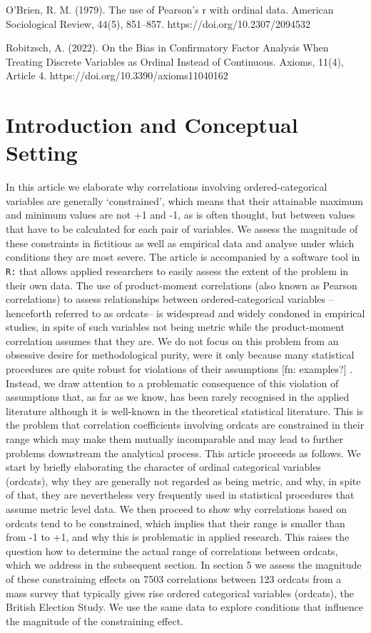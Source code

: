 \documentclass[
  12pt,
]{article}
\theoremstyle{plain}
\theoremstyle{definition}
\theoremstyle{remark}
\begin{document}
O'Brien, R. M. (1979). The use of Pearson's r with ordinal data.
American Sociological Review, 44(5), 851--857.
https://doi.org/10.2307/2094532

Robitzsch, A. (2022). On the Bias in Confirmatory Factor Analysis When
Treating Discrete Variables as Ordinal Instead of Continuous. Axioms,
11(4), Article 4. https://doi.org/10.3390/axioms11040162

\section{Introduction and Conceptual
Setting}\label{introduction-and-conceptual-setting}

In this article we elaborate why correlations involving
ordered-categorical variables are generally `constrained', which means
that their attainable maximum and minimum values are not +1 and -1, as
is often thought, but between values that have to be calculated for each
pair of variables. We assess the magnitude of these constraints in
fictitious as well as empirical data and analyse under which conditions
they are most severe. The article is accompanied by a software tool in
\texttt{R:} that allows applied researchers to easily assess the extent
of the problem in their own data. The use of product-moment correlations
(also known as Pearson correlations) to assess relationships between
ordered-categorical variables --henceforth referred to as ordcats-- is
widespread and widely condoned in empirical studies, in spite of such
variables not being metric while the product-moment correlation assumes
that they are. We do not focus on this problem from an obsessive desire
for methodological purity, were it only because many statistical
procedures are quite robust for violations of their assumptions {[}fn:
examples?{]} . Instead, we draw attention to a problematic consequence
of this violation of assumptions that, as far as we know, has been
rarely recognised in the applied literature although it is well-known in
the theoretical statistical literature. This is the problem that
correlation coefficients involving ordcats are constrained in their
range which may make them mutually incomparable and may lead to further
problems downstream the analytical process. This article proceeds as
follows. We start by briefly elaborating the character of ordinal
categorical variables (ordcats), why they are generally not regarded as
being metric, and why, in spite of that, they are nevertheless very
frequently used in statistical procedures that assume metric level data.
We then proceed to show why correlations based on ordcats tend to be
constrained, which implies that their range is smaller than from -1 to
+1, and why this is problematic in applied research. This raises the
question how to determine the actual range of correlations between
ordcats, which we address in the subsequent section. In section 5 we
assess the magnitude of these constraining effects on 7503 correlations
between 123 ordcats from a mass survey that typically gives rise ordered
categorical variables (ordcats), the British Election Study. We use the
same data to explore conditions that influence the magnitude of the
constraining effect.
\end{document}
